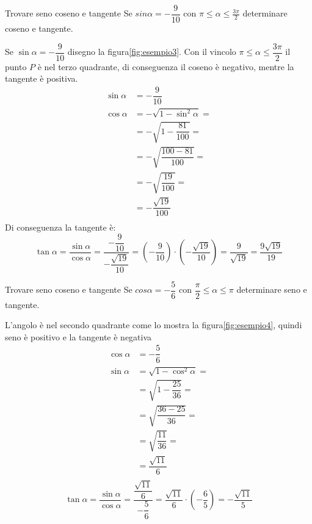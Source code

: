 \begin{esempiot}{Trovare seno coseno e tangente}{}
	Se $sin\alpha=-\dfrac{9}{10}$ con $\pi\leq\alpha\leq\frac{3\pi}{2}$ determinare coseno e tangente.
\end{esempiot}
Se $\sin\alpha=-\dfrac{9}{10}$ disegno la figura\nobs\vref{fig:esempio3}. Con il vincolo $\pi\leq\alpha\leq\dfrac{3\pi}{2}$ il punto $P$ è nel terzo quadrante, di conseguenza il coseno è negativo, mentre  la tangente è positiva.
\begin{align*}
\sin\alpha&=-\dfrac{9}{10}\\
\cos\alpha&=-\sqrt{1-\sin^2\alpha}=\\
&=-\sqrt{1-\dfrac{81}{100}}=\\
&=-\sqrt{\dfrac{100-81}{100}}=\\
&=-\sqrt{\dfrac{19}{100}}=\\
&=-\dfrac{\sqrt{19}}{100}\\
\end{align*}
Di conseguenza la tangente è:
\[\tan\alpha=\dfrac{\sin\alpha}{\cos\alpha}=\dfrac{-\dfrac{9}{10}}{-\dfrac{\sqrt{19}}{10}}=\left(-\dfrac{9}{10}\right)\cdot\left(-\dfrac{\sqrt{19}}{10}\right)=\dfrac{9}{\sqrt{19}}=\dfrac{9\sqrt{19}}{19}\]
\begin{esempiot}{Trovare seno coseno e tangente}{}
	Se $cos\alpha=-\dfrac{5}{6}$ con $\dfrac{\pi}{2}\leq\alpha\leq \pi$ determinare seno e tangente.
\end{esempiot}
L'angolo è nel secondo quadrante come lo mostra la figura\nobs\vref{fig:esempio4}, quindi seno è positivo e la tangente è negativa
\begin{align*}
\cos\alpha&=-\dfrac{5}{6}\\
\sin\alpha&=\sqrt{1-\cos^2\alpha}=\\
&=\sqrt{1-\dfrac{25}{36}}=\\
&=\sqrt{\dfrac{36-25}{36}}=\\
&=\sqrt{\dfrac{11}{36}}=\\
&=\dfrac{\sqrt{11}}{6}\\
\end{align*}
\[\tan\alpha=\dfrac{\sin\alpha}{\cos\alpha}=\dfrac{\dfrac{\sqrt{11}}{6}}{-\dfrac{5}{6}}=\dfrac{\sqrt{11}}{6}\cdot\left(-\dfrac{6}{5}\right)=-\dfrac{\sqrt{11}}{5}\]
